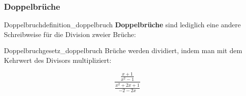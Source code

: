 \subsubsection{Doppelbrüche}


\begin{definition}{Doppelbruch}{definition_doppelbruch}
  \textbf{Doppelbrüche} sind lediglich eine andere Schreibweise für die
  Division zweier Brüche:\\

  \begin{center}
  \end{center}
\end{definition}

\begin{gesetz}{Doppelbruch}{gesetz_doppelbruch}
  Brüche werden dividiert, indem man mit dem Kehrwert des Divisors multipliziert:\\

  \begin{center}
  \end{center}
\end{gesetz}


\begin{beispiel}{}{}
$$\frac{\frac{x+1}{x^2-1}}{\frac{x^2+2x+1}{-2-2x}}$$
\end{beispiel}

